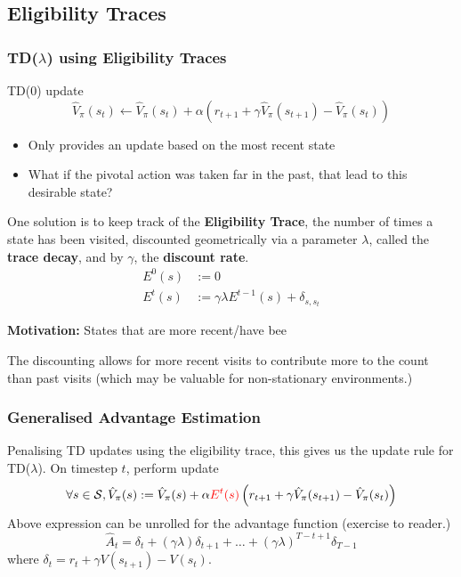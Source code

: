 \documentclass[10pt,a4paper, handout]{beamer}
\newcommand{\red}[1]{\textcolor{red}{#1}}
\begin{document}
\subsection{Eligibility Traces}
\begin{frame}
	\frametitle{TD($\lambda$) using Eligibility Traces}
	
	\begin{block}{TD(0) update}
		$$
		\hat{V}_\pi(s_t)  \leftarrow
		\hat{V}_\pi(s_t) + \alpha \left( r_{t+1} + \gamma \hat{V}_\pi(s_{t+1}) - \hat{V}_\pi(s_t) \right) 
		$$
	\end{block}
	
	\begin{itemize}
		\item Only provides an update based on the most recent state
		\pause
		\item What if the pivotal action was taken far in the past,
		that lead to this desirable state?
		\pause
	\end{itemize}
	
	One solution is to keep track of the \textbf{Eligibility Trace}, the number of times a state has been visited, discounted
	geometrically via a parameter $\lambda$, called the \textbf{trace decay}, and by $\gamma$, the \textbf{discount rate}.
	\begin{align*}
		E^0(s) &:= 0 \\
		E^t(s) &:= \gamma \lambda E^{t-1}(s) + \delta_{s, s_t}
	\end{align*}
	
	\pause
	
			\textbf{Motivation:} States that are more recent/have bee
			
	The discounting allows for more recent visits to contribute more to the count than past visits (which may be valuable for
	non-stationary environments.)
	\pause
	
\end{frame}

\begin{frame}
	\frametitle{Generalised Advantage Estimation}
	
	Penalising TD updates using the eligibility trace, this gives us the update rule for TD($\lambda$). On timestep $t$, perform update
	\begin{align*}
		\forall s \in \mathcal{S}, \hat{V}_\pi(s) & := \hat{V}_\pi(s) + \alpha \red{E^t(s)}  \left( r_{t+1} + \gamma \hat{V}_\pi(s_{t+1}) - \hat{V}_\pi(s_t) \right)  \\
	\end{align*}
	Above expression can be unrolled for the advantage function (exercise to reader.) 
	$$
	\hat{A}_t = \delta_t +(\gamma \lambda)\delta_{t+1} + \ldots + 
	(\gamma \lambda)^{T-t+1} \delta_{T-1}
	$$
	where
	$\delta_t = r_t + \gamma V(s_{t+1}) - V(s_t)$.
\end{frame}
\end{document}
